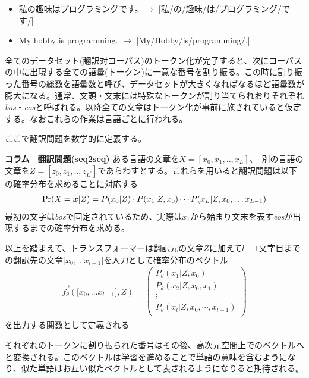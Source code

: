 \begin{itemize}
\item 私の趣味はプログラミングです。$\rightarrow$ [私/の/趣味/は/プログラミング/です/]
\item My hobby is programming. $\rightarrow$ [My/Hobby/is/programming/.]
\end{itemize}

全てのデータセット(翻訳対コーパス)のトークン化が完了すると、次にコーパスの中に出現する全ての語彙(トークン)に一意な番号を割り振る。この時に割り振った番号の総数を語彙数と呼び、データセットが大きくなればなるほど語彙数が膨大になる。通常、文頭・文末には特殊なトークンが割り当てられおりそれぞれ\emph{bos}・\emph{eos}と呼ばれる。以降全ての文章はトークン化が事前に施されていると仮定する。なおこれらの作業は言語ごとに行われる。

ここで翻訳問題を数学的に定義する。

\begin{itembox}{\bf コラム　翻訳問題(seq2seq)}
  ある言語の文章を$X = [x_0, x_1, .., x_{L}]$、　別の言語の文章を$Z = [z_0, z_1, .., z_{L^\prime}]$であらわすとする。これらを用いると翻訳問題は以下の確率分布を求めることに対応する
  \begin{align}
    \Pr(X = \boldsymbol{x}|Z) = P(x_0| Z) \cdot P(x_1| Z, x_0) \cdots P(x_L| Z, x_0, \ldots x_{L-1})
  \end{align}
  最初の文字は\emph{bos}で固定されているため、実際は$x_1$から始まり文末を表す\emph{eos}が出現するまでの確率分布を求める。

  以上を踏まえて、トランスフォーマーは翻訳元の文章$Z$に加えて$l-1$文字目までの翻訳先の文章$\lbrack x_0, \ldots x_{l-1} \rbrack$を入力として確率分布のベクトル
  \begin{align}
    \label{eq:trans}
    \vec{f_\theta}(\lbrack x_0, \ldots x_{l-1} \rbrack,Z) = 
    \begin{pmatrix} 
      P_\theta(x_1 | Z, x_0)\\
      P_\theta(x_2 | Z, x_0, x_1)\\ 
      \vdots\\
      P_\theta(x_l | Z, x_0, \cdots, x_{l-1} )\\
      \end{pmatrix}
  \end{align}
  を出力する関数として定義される
\end{itembox}

\vspace{5mm}
それぞれのトークンに割り振られた番号はその後、高次元空間上でのベクトルへと変換される。このベクトルは学習を進めることで単語の意味を含むようになり、似た単語はお互い似たベクトルとして表されるようになりると期待される。


